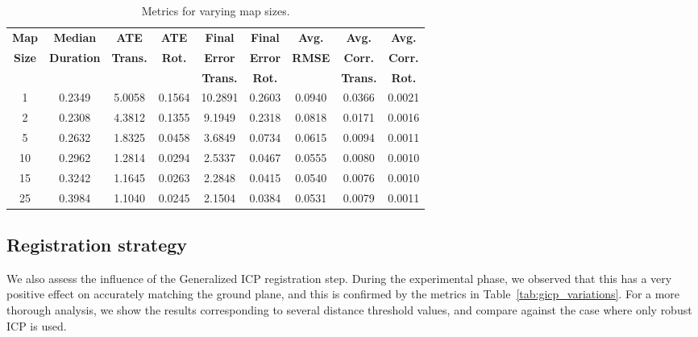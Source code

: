 \begin{table}[h]
    \centering
    \begin{tabular}{c|cccccccc}
        \hline
        \textbf{Map}  & \textbf{Median}   & \textbf{ATE}    & \textbf{ATE}  & \textbf{Final } & \textbf{Final} & \textbf{Avg.} & \textbf{Avg.}   & \textbf{Avg.}  \\
        \textbf{Size} & \textbf{Duration} & \textbf{Trans.} & \textbf{Rot.} & \textbf{Error}  & \textbf{Error} & \textbf{RMSE} & \textbf{Corr.}  & \textbf{Corr.} \\
                      &                   & \textbf{}       & \textbf{}     & \textbf{Trans.} & \textbf{Rot.}  & \textbf{}     & \textbf{Trans.} & \textbf{Rot.}  \\
        \hline \hline
        1             & 0.2349            & 5.0058          & 0.1564        & 10.2891         & 0.2603         & 0.0940        & 0.0366          & 0.0021         \\
        2             & 0.2308            & 4.3812          & 0.1355        & 9.1949          & 0.2318         & 0.0818        & 0.0171          & 0.0016         \\
        5             & 0.2632            & 1.8325          & 0.0458        & 3.6849          & 0.0734         & 0.0615        & 0.0094          & 0.0011         \\
        10            & 0.2962            & 1.2814          & 0.0294        & 2.5337          & 0.0467         & 0.0555        & 0.0080          & 0.0010         \\
        15            & 0.3242            & 1.1645          & 0.0263        & 2.2848          & 0.0415         & 0.0540        & 0.0076          & 0.0010         \\
        25            & 0.3984            & 1.1040          & 0.0245        & 2.1504          & 0.0384         & 0.0531        & 0.0079          & 0.0011         \\
        \hline
    \end{tabular}
    \caption{Metrics for varying map sizes.}
    \label{tab:map_sizes}
\end{table}

\subsection{Registration strategy}

We also assess the influence of the Generalized ICP registration step. During the experimental phase, we observed that this has a very positive effect on accurately matching the ground plane, and this is confirmed by the metrics in Table~\ref{tab:gicp_variations}. For a more thorough analysis, we show the results corresponding to several distance threshold values, and compare against the case where only robust ICP is used.

